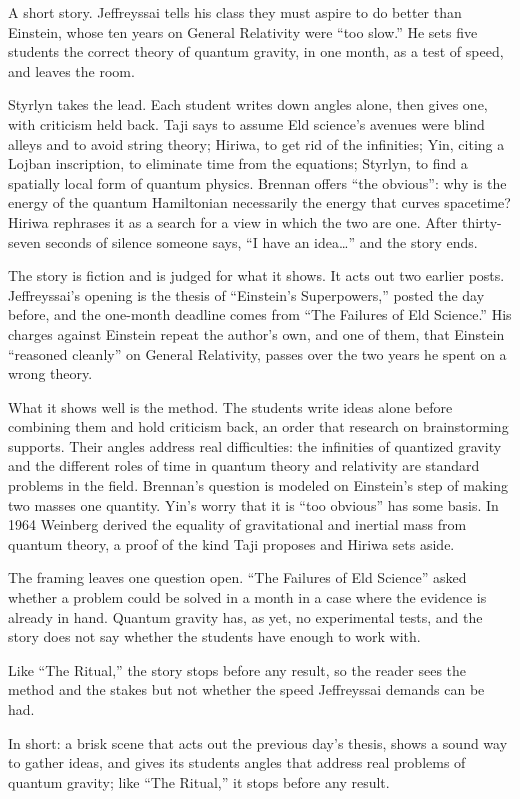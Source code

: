 \begin{afterword}
\summaryhead

A short story. Jeffreyssai tells his class they must aspire to do better than Einstein, whose ten years on General Relativity were ``too slow.'' He sets five students the correct theory of quantum gravity, in one month, as a test of speed, and leaves the room.

Styrlyn takes the lead. Each student writes down angles alone, then gives one, with criticism held back. Taji says to assume Eld science's avenues were blind alleys and to avoid string theory; Hiriwa, to get rid of the infinities; Yin, citing a Lojban inscription, to eliminate time from the equations; Styrlyn, to find a spatially local form of quantum physics. Brennan offers ``the obvious'': why is the energy of the quantum Hamiltonian necessarily the energy that curves spacetime? Hiriwa rephrases it as a search for a view in which the two are one. After thirty-seven seconds of silence someone says, ``I have an idea\ldots'' and the story ends.

\responsehead

The story is fiction and is judged for what it shows. It acts out two earlier posts. Jeffreyssai's opening is the thesis of ``Einstein's Superpowers,'' posted the day before, and the one-month deadline comes from ``The Failures of Eld Science.'' His charges against Einstein repeat the author's own, and one of them, that Einstein ``reasoned cleanly'' on General Relativity, passes over the two years he spent on a wrong theory.

What it shows well is the method. The students write ideas alone before combining them and hold criticism back, an order that research on brainstorming supports. Their angles address real difficulties: the infinities of quantized gravity and the different roles of time in quantum theory and relativity are standard problems in the field. Brennan's question is modeled on Einstein's step of making two masses one quantity. Yin's worry that it is ``too obvious'' has some basis. In 1964 Weinberg derived the equality of gravitational and inertial mass from quantum theory, a proof of the kind Taji proposes and Hiriwa sets aside.

The framing leaves one question open. ``The Failures of Eld Science'' asked whether a problem could be solved in a month in a case where the evidence is already in hand. Quantum gravity has, as yet, no experimental tests, and the story does not say whether the students have enough to work with.

Like ``The Ritual,'' the story stops before any result, so the reader sees the method and the stakes but not whether the speed Jeffreyssai demands can be had.

In short: a brisk scene that acts out the previous day's thesis, shows a sound way to gather ideas, and gives its students angles that address real problems of quantum gravity; like ``The Ritual,'' it stops before any result.
\end{afterword}
